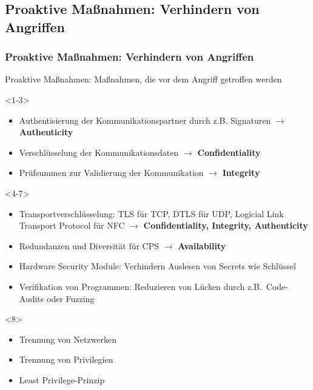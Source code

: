 \documentclass{sikslides}
\begin{document}
    \subsection{Proaktive Maßnahmen: Verhindern von Angriffen}
    \begin{frame}
        \frametitle{Proaktive Maßnahmen: Verhindern von Angriffen}
        \begin{block}{}
            Proaktive Maßnahmen: Maßnahmen, die vor dem Angriff getroffen werden
        \end{block}
        \vspace{20px}

        \begin{onlyenv}<1-3>
            \begin{itemize}[<+->]
                \item Authentisierung der Kommunikationspartner durch z.B. Signaturen $\rightarrow$ \textbf{Authenticity}
                \item Verschlüsselung der Kommunikationsdaten $\rightarrow$ \textbf{Confidentiality}
                \item Prüfsummen zur Validierung der Kommunikation $\rightarrow$ \textbf{Integrity}
            \end{itemize}
        \end{onlyenv}

        \begin{onlyenv}<4-7>
            \begin{itemize}[<+->]
                \item Transportverschlüsselung: TLS für TCP, DTLS für UDP, Logicial Link Transport Protocol für NFC $\rightarrow$ \textbf{Confidentiality, Integrity, Authenticity}
                \item Redundanzen und Diversität für CPS $\rightarrow$ \textbf{Availability}
                \item Hardware Security Module: Verhindern Auslesen von Secrets wie Schlüssel
                \item Verifikation von Programmen: Reduzieren von Lücken durch z.B.\ Code-Audits oder Fuzzing
            \end{itemize}
        \end{onlyenv}

        \begin{onlyenv}<8>
            \begin{itemize}
                \item Trennung von Netzwerken
                \item Trennung von Privilegien
                \item Least Privilege-Prinzip
                \pause
            \end{itemize}
        \end{onlyenv}


\end{frame}
\end{document}
